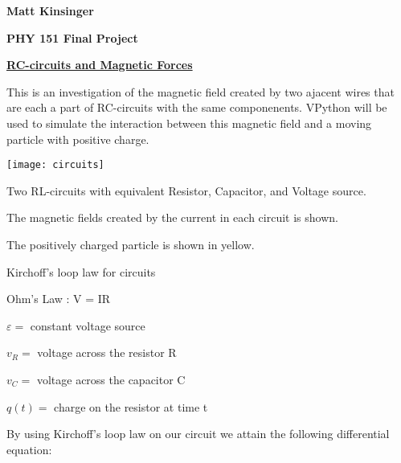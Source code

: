 \documentclass[11pt]{article}
\begin{document}
\vspace*{-.4in}

\begin{center}
{\Large\bf Matt Kinsinger }

{\bf PHY 151 Final Project}

{\bf\underline{RC-circuits and Magnetic Forces}}

\end{center}

\vspace{.1in}

 This is an investigation of the magnetic field created by two ajacent wires that are each a part of RC-circuits with the same componenents. VPython will be used to simulate the interaction between this magnetic field and a moving particle with positive charge.
\vspace{.5in}

\begin{center}
\texttt{[image: circuits]}

Two RL-circuits with equivalent Resistor, Capacitor, and Voltage source.

The magnetic fields created by the current in each circuit is shown.

The positively charged particle is shown in yellow.

\end{center}



\newpage

\noindent Kirchoff's loop law for circuits

\noindent Ohm's Law : V = IR

\noindent $\varepsilon =$ constant voltage source


\noindent $v_R=$ voltage across the resistor R

\noindent $v_C=$ voltage across the capacitor C

\noindent $q(t)=$ charge on the resistor at time t

\vspace{.2in}

\noindent By using Kirchoff's loop law on our circuit we attain the following differential equation:
\end{document}
